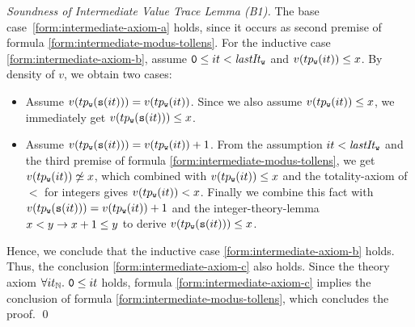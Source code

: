 \begin{proof}[Soundness of Intermediate Value Trace Lemma (B1)]
	The base case~\eqref{form:intermediate-axiom-a} holds, since it occurs as second premise of formula \eqref{form:intermediate-modus-tollens}. For the inductive case \eqref{form:intermediate-axiom-b}, assume ${\tt 0} \leq it < \mathit{lastIt}_{\texttt{w}}$ and $v(tp_{\texttt{w}}(it)) \leq x$. By density of $v$, we obtain two cases: 
	\begin{itemize}
		\item Assume $v(tp_{\texttt{w}}({\tt s}(it)))=v(tp_{\texttt{w}}(it))$. Since we also assume $v(tp_{\texttt{w}}(it)) \leq x$, we immediately get $v(tp_{\texttt{w}}({\tt s}(it))) \leq x$.
		\item Assume $v(tp_{\texttt{w}}({\tt s}(it)))=v(tp_{\texttt{w}}(it)) + 1$. From the assumption $it < \mathit{lastIt}_{\texttt{w}}$ and the third premise of formula \ref{form:intermediate-modus-tollens}, we get $v(tp_{\texttt{w}}(it)) \not\simeq x$, which combined with $v(tp_{\texttt{w}}(it)) \leq x$ and the totality-axiom of $<$ for integers gives $v(tp_{\texttt{w}}(it)) < x$. Finally we combine this fact with $v(tp_{\texttt{w}}({\tt s}(it)))=v(tp_{\texttt{w}}(it)) + 1$ and the integer-theory-lemma $x<y \rightarrow x+1\leq y$ to derive $v(tp_{\texttt{w}}({\tt s}(it))) \leq x$.
	\end{itemize}
	Hence, we conclude that the inductive case \eqref{form:intermediate-axiom-b} holds.
	Thus, the conclusion \eqref{form:intermediate-axiom-c} also
	holds. Since the theory axiom $\forall it_{\mathbb{N}}. \ {\tt 0} \leq
	it$ holds, formula \eqref{form:intermediate-axiom-c} implies
	the conclusion of formula
	\eqref{form:intermediate-modus-tollens}, which concludes the
	proof.
	\qed
\end{proof}


